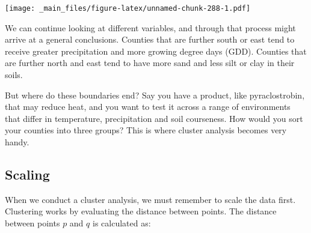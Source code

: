 \documentclass[
]{book}
\newenvironment{Shaded}{\begin{snugshade}}{\end{snugshade}}
\newcommand{\AttributeTok}[1]{\textcolor[rgb]{0.77,0.63,0.00}{#1}}
\newcommand{\DecValTok}[1]{\textcolor[rgb]{0.00,0.00,0.81}{#1}}
\newcommand{\FloatTok}[1]{\textcolor[rgb]{0.00,0.00,0.81}{#1}}
\newcommand{\FunctionTok}[1]{\textcolor[rgb]{0.00,0.00,0.00}{#1}}
\newcommand{\NormalTok}[1]{#1}
\newcommand{\OtherTok}[1]{\textcolor[rgb]{0.56,0.35,0.01}{#1}}
\newcommand{\SpecialCharTok}[1]{\textcolor[rgb]{0.00,0.00,0.00}{#1}}
\newcommand{\StringTok}[1]{\textcolor[rgb]{0.31,0.60,0.02}{#1}}
\begin{document}
\begin{Shaded}
\end{Shaded}

\texttt{[image: \_main\_files/figure-latex/unnamed-chunk-288-1.pdf]}

We can continue looking at different variables, and through that process might arrive at a general conclusions. Counties that are further south or east tend to receive greater precipitation and more growing degree days (GDD). Counties that are further north and east tend to have more sand and less silt or clay in their soils.

But where do these boundaries end? Say you have a product, like pyraclostrobin, that may reduce heat, and you want to test it across a range of environments that differ in temperature, precipitation and soil courseness. How would you sort your counties into three groups? This is where cluster analysis becomes very handy.

\hypertarget{scaling}{%
\subsection{Scaling}\label{scaling}}

When we conduct a cluster analysis, we must remember to scale the data first. Clustering works by evaluating the distance between points. The distance between points \(p\) and \(q\) is calculated as:
\end{document}
